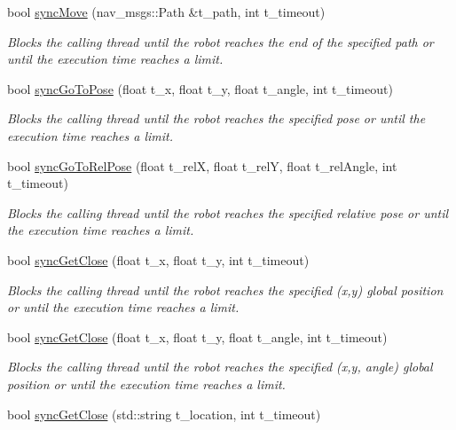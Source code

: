 \begin{DoxyCompactItemize}
bool \hyperlink{class_navigation_tasks_adca3e489a551f659a4fddf3dd33e5851}{sync\+Move} (nav\+\_\+msgs\+::\+Path \&t\+\_\+path, int t\+\_\+timeout)
\begin{DoxyCompactList}\small\item\em Blocks the calling thread until the robot reaches the end of the specified path or until the execution time reaches a limit. \end{DoxyCompactList}\item 
bool \hyperlink{class_navigation_tasks_abb964f84a946da89bfc2d91da3e0dc44}{sync\+Go\+To\+Pose} (float t\+\_\+x, float t\+\_\+y, float t\+\_\+angle, int t\+\_\+timeout)
\begin{DoxyCompactList}\small\item\em Blocks the calling thread until the robot reaches the specified pose or until the execution time reaches a limit. \end{DoxyCompactList}\item 
bool \hyperlink{class_navigation_tasks_a881fcc0eaf1f12cb9920a76c22bb342f}{sync\+Go\+To\+Rel\+Pose} (float t\+\_\+relX, float t\+\_\+relY, float t\+\_\+rel\+Angle, int t\+\_\+timeout)
\begin{DoxyCompactList}\small\item\em Blocks the calling thread until the robot reaches the specified relative pose or until the execution time reaches a limit. \end{DoxyCompactList}\item 
bool \hyperlink{class_navigation_tasks_a6c253bfcb8db39242955c6d9ef614651}{sync\+Get\+Close} (float t\+\_\+x, float t\+\_\+y, int t\+\_\+timeout)
\begin{DoxyCompactList}\small\item\em Blocks the calling thread until the robot reaches the specified (x,y) global position or until the execution time reaches a limit. \end{DoxyCompactList}\item 
bool \hyperlink{class_navigation_tasks_a363b0e720a22ccbe90edff1cc9cc80a5}{sync\+Get\+Close} (float t\+\_\+x, float t\+\_\+y, float t\+\_\+angle, int t\+\_\+timeout)
\begin{DoxyCompactList}\small\item\em Blocks the calling thread until the robot reaches the specified (x,y, angle) global position or until the execution time reaches a limit. \end{DoxyCompactList}\item 
bool \hyperlink{class_navigation_tasks_ac6aa9dd6e3d4c32f70caf632c8f8b41c}{sync\+Get\+Close} (std\+::string t\+\_\+location, int t\+\_\+timeout)

\end{DoxyCompactItemize}
